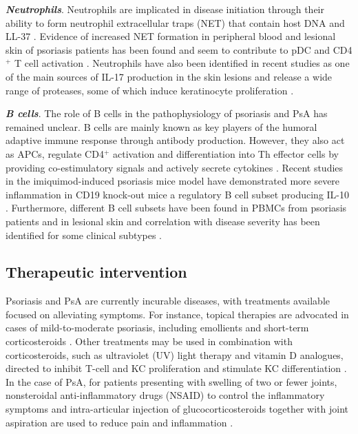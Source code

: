 \textbf{\textit{Neutrophils}}. Neutrophils are implicated in disease initiation through their ability to form neutrophil extracellular traps (NET) that contain host DNA and LL-37 \parencite{Hu2016}. Evidence of increased NET formation in peripheral blood and lesional skin of psoriasis patients has been found and seem to contribute to pDC and CD4$^+$ T cell activation \parencite{Hu2016}. Neutrophils have also been identified in recent studies as one of the main sources of IL-17 production in the skin lesions and release a wide range of proteases, some of which induce keratinocyte proliferation \parencite{Lin2011,Mahil2006}.


%
%

\textbf{\textit{B cells}}. \textcolor[rgb]{1,0,0}{The role of B cells in the pathophysiology of psoriasis and PsA has remained unclear. B cells are mainly known as key players of the humoral adaptive immune response through antibody production. However, they also act as APCs, regulate CD4$^+$ activation and differentiation into Th effector cells by providing co-estimulatory signals and actively secrete cytokines \parencite{Bouaziz2007,Constant1995,Harris2000,Linton2003}. Recent studies in the imiquimod-induced psoriasis mice model have demonstrated more severe inflammation in CD19 knock-out mice a regulatory B cell subset producing IL-10 \parencite{Yanaba2013,Alrefai2016}. Furthermore, different B cell subsets have been found in PBMCs from psoriasis patients and in lesional skin and correlation with disease severity has been identified for some clinical subtypes \parencite{Lu2016}.}





\subsection{Therapeutic intervention}
Psoriasis and PsA are currently incurable diseases, with treatments available focused on alleviating symptoms. For instance, topical therapies are advocated in cases of mild-to-moderate psoriasis, including emollients and short-term corticosteroids \parencite{Menter2009}. Other treatments may be used in combination with corticosteroids, such as ultraviolet (UV) light therapy and vitamin D analogues, directed to inhibit T-cell and KC proliferation and stimulate KC differentiation \parencite{Rizova2001}. In the case of PsA, for patients presenting with swelling of two or fewer joints, nonsteroidal anti-inflammatory drugs (NSAID) to control the inflammatory symptoms and intra-articular injection of glucocorticosteroids together with joint aspiration are used to reduce pain and inflammation \parencite{Coates2016}. 

